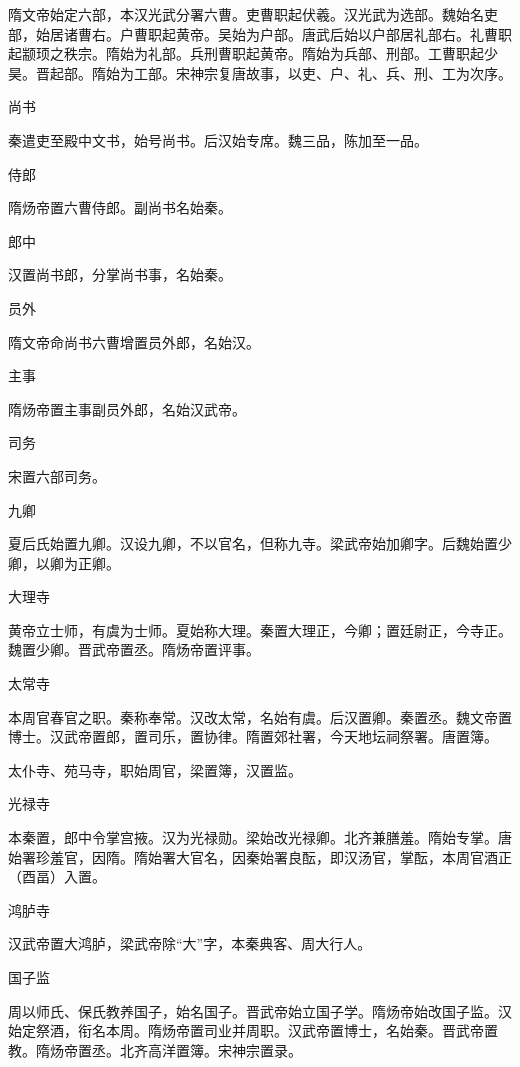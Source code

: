 \documentclass[a4paper,12pt,UTF8,twoside]{ctexbook}
\begin{document}
    隋文帝始定六部，本汉光武分署六曹。吏曹职起伏羲。汉光武为选部。魏始名吏部，始居诸曹右。户曹职起黄帝。吴始为户部。唐武后始以户部居礼部右。礼曹职起颛顼之秩宗。隋始为礼部。兵刑曹职起黄帝。隋始为兵部、刑部。工曹职起少昊。晋起部。隋始为工部。宋神宗复唐故事，以吏、户、礼、兵、刑、工为次序。
    
    尚书
    
    秦遣吏至殿中文书，始号尚书。后汉始专席。魏三品，陈加至一品。
    
    侍郎
    
    隋炀帝置六曹侍郎。副尚书名始秦。
    
    郎中
    
    汉置尚书郎，分掌尚书事，名始秦。
    
    员外
    
    隋文帝命尚书六曹增置员外郎，名始汉。
    
    主事
    
    隋炀帝置主事副员外郎，名始汉武帝。
    
    司务
    
    宋置六部司务。
    
    九卿
    
    夏后氏始置九卿。汉设九卿，不以官名，但称九寺。梁武帝始加卿字。后魏始置少卿，以卿为正卿。
    
    大理寺
    
    黄帝立士师，有虞为士师。夏始称大理。秦置大理正，今卿；置廷尉正，今寺正。魏置少卿。晋武帝置丞。隋炀帝置评事。
    
    太常寺
    
    本周官春官之职。秦称奉常。汉改太常，名始有虞。后汉置卿。秦置丞。魏文帝置博士。汉武帝置郎，置司乐，置协律。隋置郊社署，今天地坛祠祭署。唐置簿。
    
    太仆寺、苑马寺，职始周官，梁置簿，汉置监。
    
    光禄寺
    
    本秦置，郎中令掌宫掖。汉为光禄勋。梁始改光禄卿。北齐兼膳羞。隋始专掌。唐始署珍羞官，因隋。隋始署大官名，因秦始署良酝，即汉汤官，掌酝，本周官酒正（酉畐）入置。
    
    鸿胪寺
    
    汉武帝置大鸿胪，梁武帝除“大”字，本秦典客、周大行人。
    
    国子监
    
    周以师氏、保氏教养国子，始名国子。晋武帝始立国子学。隋炀帝始改国子监。汉始定祭酒，衔名本周。隋炀帝置司业并周职。汉武帝置博士，名始秦。晋武帝置教。隋炀帝置丞。北齐高洋置簿。宋神宗置录。
    
\end{document}

